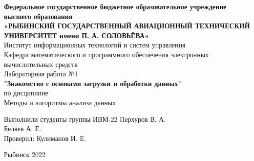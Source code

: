 \documentclass[a4paper]{article}
\begin{document}
\begin {center}
    \hfill \break
    \textbf{Федеральное государственное бюджетное образовательное учреждение высшего образования}\\
    \small{\textbf{«РЫБИНСКИЙ ГОСУДАРСТВЕННЫЙ АВИАЦИОННЫЙ ТЕХНИЧЕСКИЙ УНИВЕРСИТЕТ имени П. А. СОЛОВЬЁВА»}}\\
    \hfill \break
    \normalsize{Институт информационных технологий и систем управления}\\
    \hfill \break
    \normalsize{Кафедра математического и программного обеспечения электронных вычислительных средств}\\
    \hfill\break
    \hfill \break
    \hfill \break
    \hfill \break
    \large{Лабораторная работа №1}\\
    \normalsize{\textbf{"Знакомство с основами загрузки и обработки данных"}}\\
    \hfill \break
    \hfill \break
    \hfill \break
    \normalsize{по дисциплине\\
Методы и алгоритмы анализа данных\\}
    \hfill \break
    \hfill \break
    \hfill \break
    \hfill \break
    \hfill \break
\end {center}

\begin {flushleft}
\normalsize{ 
    Выполнили студенты 
    группы ИВМ-22  
    \hfill Перхуров В. А. \\
    \hfill Беляев А. Е. \\
    \hfill \break
    Проверил: 
    \hfill Кулиманов И. Е. 
}
\end {flushleft}

\hfill \break
\hfill \break
\hfill \break
\hfill \break
\hfill \break
\hfill \break
\hfill \break

\begin{center} 
    Рыбинск 2022 
\end{center}
\thispagestyle{empty} 

\end{document}
